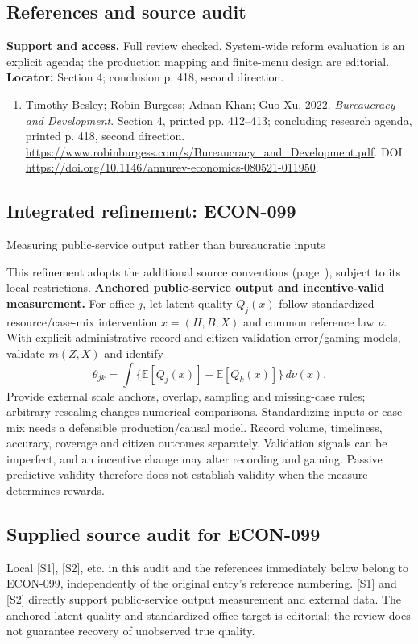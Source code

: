 \documentclass[11pt,a4paper]{article}
\begin{document}
\subsection*{References and source audit}
\textbf{Support and access.} Full review checked. System-wide reform evaluation is an explicit agenda; the production mapping and finite-menu design are editorial. \textbf{Locator:} Section 4; conclusion p. 418, second direction.
\begin{enumerate}\raggedright
\item\hypertarget{definitions:source:30007664:1}{} Timothy Besley; Robin Burgess; Adnan Khan; Guo Xu. 2022. \emph{Bureaucracy and Development}. Section 4, printed pp. 412–413; concluding research agenda, printed p. 418, second direction.
\url{https://www.robinburgess.com/s/Bureaucracy_and_Development.pdf}.
DOI: \url{https://doi.org/10.1146/annurev-economics-080521-011950}.
\end{enumerate}

\subsection*{Integrated refinement: ECON-099}
{\sffamily\small\color{muted}Measuring public-service output rather than bureaucratic inputs\par}
This refinement adopts the additional source conventions
(page~\pageref{audited:conventions}), subject to its local restrictions.
\textbf{Anchored public-service output and incentive-valid measurement.}
For office $j$, let latent quality $Q_j(x)$ follow standardized resource/case-mix
intervention $x=(H,B,X)$ and common reference law $\nu$. With explicit
administrative-record and citizen-validation error/gaming models, validate
$m(Z,X)$ and identify
\[
\theta_{jk}=\int\{\mathbb E[Q_j(x)]-\mathbb E[Q_k(x)]\}\,d\nu(x).
\]
Provide external scale anchors, overlap, sampling and missing-case rules;
arbitrary rescaling changes numerical comparisons. Standardizing inputs or case
mix needs a defensible production/causal model. Record volume, timeliness,
accuracy, coverage and citizen outcomes separately. Validation signals can be
imperfect, and an incentive change may alter recording and gaming. Passive
predictive validity therefore does not establish validity when the measure
determines rewards.
\subsection*{Supplied source audit for ECON-099}
Local [S1], [S2], etc. in this audit and the references immediately below
belong to ECON-099, independently of the original entry's reference numbering.
[S1] and [S2] directly support public-service output measurement and external data. The anchored latent-quality and standardized-office target is editorial; the review does not guarantee recovery of unobserved true quality.
\end{document}
